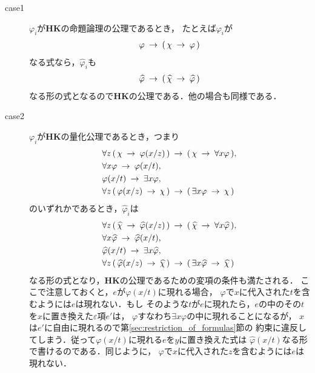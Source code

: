 	\begin{metaprf}\mbox{}
		\begin{description}
			\item[case1] $\varphi_{i}$が{\bf HK}の命題論理の公理であるとき，
				たとえば$\varphi_{i}$が
				\begin{align}
					\varphi \hspace{0.25em}\rightarrow\hspace{0.25em} (\, \chi \hspace{0.25em}\rightarrow\hspace{0.25em} \varphi\, )
				\end{align}
				なる式なら，$\widehat{\varphi}_{i}$も
				\begin{align}
					\widehat{\varphi} \hspace{0.25em}\rightarrow\hspace{0.25em} 
					(\, \widehat{\chi} \hspace{0.25em}\rightarrow\hspace{0.25em} \widehat{\varphi}\, )
				\end{align}
				なる形の式となるので{\bf HK}の公理である．他の場合も同様である．
				
			\item[case2] $\varphi_{i}$が{\bf HK}の量化公理であるとき，つまり
				\begin{align}
					&\forall z\, (\, \chi \hspace{0.25em}\rightarrow\hspace{0.25em} \varphi(x/z)\, ) 
						\hspace{0.25em}\rightarrow\hspace{0.25em} (\, \chi \hspace{0.25em}\rightarrow\hspace{0.25em} \forall x \varphi\, ), \\
					&\forall x \varphi \hspace{0.25em}\rightarrow\hspace{0.25em} \varphi(x/t), \\
					&\varphi(x/t) \hspace{0.25em}\rightarrow\hspace{0.25em} \exists x \varphi, \\
					&\forall z\, (\, \varphi(x/z) \hspace{0.25em}\rightarrow\hspace{0.25em} \chi\, )
						\hspace{0.25em}\rightarrow\hspace{0.25em} (\, \exists x \varphi \hspace{0.25em}\rightarrow\hspace{0.25em} \chi\, )
				\end{align}
				のいずれかであるとき，$\widehat{\varphi}_{i}$は
				\begin{align}
					&\forall z\, (\, \widehat{\chi} \hspace{0.25em}\rightarrow\hspace{0.25em} \widehat{\varphi}(x/z)\, ) 
						\hspace{0.25em}\rightarrow\hspace{0.25em} (\, \widehat{\chi} \hspace{0.25em}\rightarrow\hspace{0.25em} \forall x \widehat{\varphi}\, ), \\
					&\forall x \widehat{\varphi} \hspace{0.25em}\rightarrow\hspace{0.25em} \widehat{\varphi}(x/t), \\
					&\widehat{\varphi}(x/t) \hspace{0.25em}\rightarrow\hspace{0.25em} \exists x \widehat{\varphi}, \\
					&\forall z\, (\, \widehat{\varphi}(x/z) \hspace{0.25em}\rightarrow\hspace{0.25em} \widehat{\chi}\, )
						\hspace{0.25em}\rightarrow\hspace{0.25em} (\, \exists x \widehat{\varphi} \hspace{0.25em}\rightarrow\hspace{0.25em} \widehat{\chi}\, )
				\end{align}
				なる形の式となり，{\bf HK}の公理であるための変項の条件も満たされる．
				ここで注意しておくと，$e$が$\varphi(x/t)$に現れる場合，
				$\varphi$で$x$に代入された$t$を含むようには$e$は現れない．もし
				そのような$t$が$e$に現れたら，$e$の中のその$t$を$x$に置き換えた$\varepsilon$項$e'$は，
				$\varphi$すなわち$\exists x \varphi$の中に現れることになるが，
				$x$は$e'$に自由に現れるので第\ref{sec:restriction_of_formulas}節の
				約束に違反してしまう．従って$\varphi(x/t)$に現れる$e$を$y$に置き換えた式は
				$\widehat{\varphi}(x/t)$なる形で書けるのである．同じように，
				$\varphi$で$x$に代入された$z$を含むようには$e$は現れない．
				

\end{description}
\end{metaprf}
